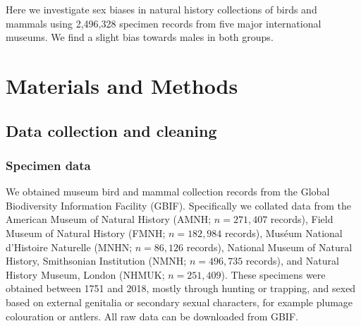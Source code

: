 \documentclass[a4paper, 12pt]{article}
\begin{document}
Here we investigate sex biases in natural history collections of birds and mammals using 2,496,328 specimen records from five major international museums.
We find a slight bias towards males in both groups.

\newpage
\begin{landscape}
  
\end{landscape}

\section{Materials and Methods}
\subsection{Data collection and cleaning}
\subsubsection{Specimen data} 
We obtained museum bird and mammal collection records from the Global Biodiversity Information Facility (GBIF\cite{gbif}). 
Specifically we collated data from the American Museum of Natural History (AMNH; $n = 271,407$ records\cite{amnh-birds,amnh-mammals}), Field Museum of Natural History (FMNH; $n = 182,984$ records\cite{fmnh-birds,fmnh-mammals}), Mus\'{e}um National d'Histoire Naturelle (MNHN; $n = 86,126$ records\cite{mnhn-birds,mnhn-mammals}), National Museum of Natural History, Smithsonian Institution (NMNH; $n = 496,735$ records\cite{smithsonian-both}), and Natural History Museum, London (NHMUK; $n = 251,409$\cite{nhm-all}).
These specimens were obtained between 1751 and 2018, mostly through hunting or trapping, and sexed based on external genitalia or secondary sexual characters, for example plumage colouration or antlers.
All raw data can be downloaded from GBIF\cite{gbif}.
 
\end{document}
